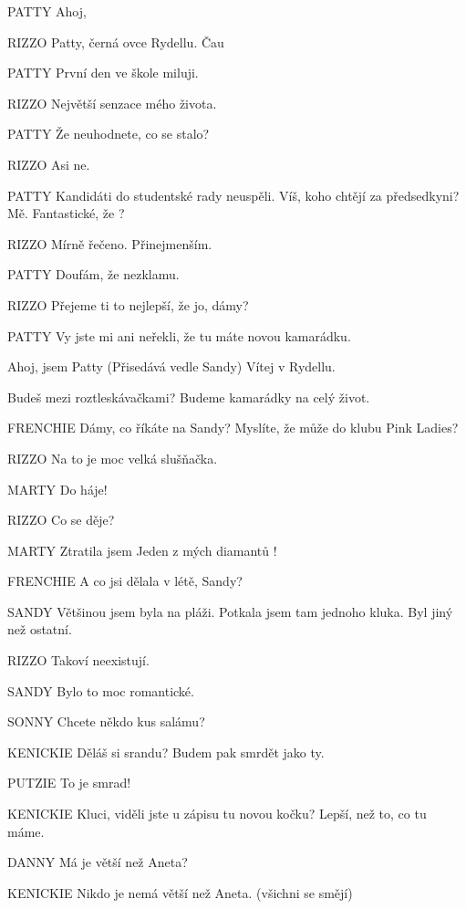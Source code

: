 PATTY        Ahoj, 

RIZZO        Patty, černá ovce Rydellu. Čau

PATTY        První den ve škole miluji.

RIZZO        Největší senzace mého života.

PATTY        Že neuhodnete, co se stalo?

RIZZO        Asi ne.

PATTY        Kandidáti do studentské rady neuspěli. Víš, koho chtějí za                         předsedkyni? Mě. Fantastické, že ?

RIZZO        Mírně řečeno. Přinejmenším.

PATTY        Doufám, že nezklamu.

RIZZO        Přejeme ti to nejlepší, že jo, dámy?

PATTY        Vy jste mi ani neřekli, že tu máte novou kamarádku.

                Ahoj, jsem Patty (Přisedává vedle Sandy) Vítej v Rydellu.

                Budeš mezi roztleskávačkami? Budeme kamarádky na celý život.

FRENCHIE        Dámy, co říkáte na Sandy? Myslíte, že může do klubu Pink Ladies?

RIZZO        Na to je moc velká slušňačka.

MARTY        Do háje!

RIZZO        Co se děje?

MARTY         Ztratila jsem Jeden z mých diamantů !

FRENCHIE         A co jsi dělala v létě, Sandy?

SANDY        Většinou jsem byla na pláži. Potkala jsem tam jednoho kluka. Byl jiný         než ostatní.

RIZZO        Takoví neexistují.

SANDY        Bylo to moc romantické.





SONNY        Chcete někdo kus salámu?

KENICKIE         Děláš si srandu? Budem pak smrdět jako ty.

PUTZIE         To je smrad!

KENICKIE        Kluci, viděli jste u zápisu tu novou kočku? Lepší, než to, co tu máme.

DANNY        Má je větší než Aneta?

KENICKIE        Nikdo je nemá větší než Aneta. (všichni se smějí)

